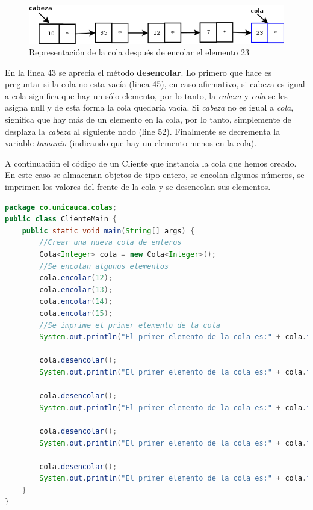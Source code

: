 \begin{figure}
	\centering
	\includegraphics[scale=0.7]{Diagramas/RepresentacionColaNodosEnlazadosEncolar}
	\caption{Representación de la cola después de encolar el elemento 23}	
	\label{fig:cola-nodos-enlazados-encolar}
\end{figure}

En la linea 43 se aprecia el método \textbf{desencolar}. Lo primero que hace es preguntar si la cola no esta vacía (linea 45), en caso afirmativo, si cabeza es igual a cola significa que hay un sólo elemento, por lo tanto,  la \textit{cabeza} y \textit{cola} se les asigna null y de esta forma la cola quedaría vacía. Si \textit{cabeza} no es igual a \textit{cola}, significa que hay más de un elemento en la cola, por lo tanto, simplemente de desplaza la \textit{cabeza} al siguiente nodo (line 52). Finalmente se decrementa la variable \textit{tamanio} (indicando que hay un elemento menos en la cola).

A continuación el código de un Cliente que instancia la cola que hemos creado. En este caso se almacenan objetos de tipo entero, se encolan algunos números, se imprimen los valores del frente de la cola y se desencolan sus elementos.

\begin{lstlisting}[language=Java]
package co.unicauca.colas;
public class ClienteMain {
	public static void main(String[] args) {
		//Crear una nueva cola de enteros
		Cola<Integer> cola = new Cola<Integer>();
		//Se encolan algunos elementos
		cola.encolar(12);
		cola.encolar(13);
		cola.encolar(14);
		cola.encolar(15);
		//Se imprime el primer elemento de la cola
		System.out.println("El primer elemento de la cola es:" + cola.frente());
		
		cola.desencolar();
		System.out.println("El primer elemento de la cola es:" + cola.frente().toString());
		
		cola.desencolar();
		System.out.println("El primer elemento de la cola es:" + cola.frente());

		cola.desencolar();
		System.out.println("El primer elemento de la cola es:" + cola.frente());

		cola.desencolar();
		System.out.println("El primer elemento de la cola es:" + cola.frente());
 	}
}
\end{lstlisting}

